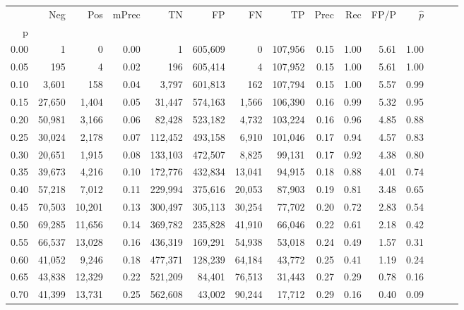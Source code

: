 \begin{tabular}{rrrrrrrrrrrrrrr}
\toprule
{} &     Neg &     Pos & mPrec &       TN &       FP &       FN &       TP &  Prec &   Rec &  FP/P & $\hat{p}$ \\
p    &         &         &       &          &          &          &          &       &       &       &           \\
\midrule
0.00 &       1 &       0 &  0.00 &        1 &  605,609 &        0 &  107,956 &  0.15 &  1.00 &  5.61 &      1.00 \\
0.05 &     195 &       4 &  0.02 &      196 &  605,414 &        4 &  107,952 &  0.15 &  1.00 &  5.61 &      1.00 \\
0.10 &   3,601 &     158 &  0.04 &    3,797 &  601,813 &      162 &  107,794 &  0.15 &  1.00 &  5.57 &      0.99 \\
0.15 &  27,650 &   1,404 &  0.05 &   31,447 &  574,163 &    1,566 &  106,390 &  0.16 &  0.99 &  5.32 &      0.95 \\
0.20 &  50,981 &   3,166 &  0.06 &   82,428 &  523,182 &    4,732 &  103,224 &  0.16 &  0.96 &  4.85 &      0.88 \\
0.25 &  30,024 &   2,178 &  0.07 &  112,452 &  493,158 &    6,910 &  101,046 &  0.17 &  0.94 &  4.57 &      0.83 \\
0.30 &  20,651 &   1,915 &  0.08 &  133,103 &  472,507 &    8,825 &   99,131 &  0.17 &  0.92 &  4.38 &      0.80 \\
0.35 &  39,673 &   4,216 &  0.10 &  172,776 &  432,834 &   13,041 &   94,915 &  0.18 &  0.88 &  4.01 &      0.74 \\
0.40 &  57,218 &   7,012 &  0.11 &  229,994 &  375,616 &   20,053 &   87,903 &  0.19 &  0.81 &  3.48 &      0.65 \\
0.45 &  70,503 &  10,201 &  0.13 &  300,497 &  305,113 &   30,254 &   77,702 &  0.20 &  0.72 &  2.83 &      0.54 \\
0.50 &  69,285 &  11,656 &  0.14 &  369,782 &  235,828 &   41,910 &   66,046 &  0.22 &  0.61 &  2.18 &      0.42 \\
0.55 &  66,537 &  13,028 &  0.16 &  436,319 &  169,291 &   54,938 &   53,018 &  0.24 &  0.49 &  1.57 &      0.31 \\
0.60 &  41,052 &   9,246 &  0.18 &  477,371 &  128,239 &   64,184 &   43,772 &  0.25 &  0.41 &  1.19 &      0.24 \\
0.65 &  43,838 &  12,329 &  0.22 &  521,209 &   84,401 &   76,513 &   31,443 &  0.27 &  0.29 &  0.78 &      0.16 \\
0.70 &  41,399 &  13,731 &  0.25 &  562,608 &   43,002 &   90,244 &   17,712 &  0.29 &  0.16 &  0.40 &      0.09 \\

\end{tabular}
